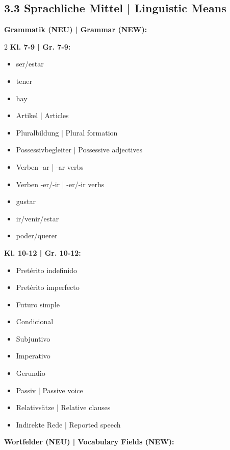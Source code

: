 \documentclass[11pt,a4paper]{article}
\begin{document}
\subsection*{3.3 Sprachliche Mittel | Linguistic Means}

\textbf{Grammatik (NEU) | Grammar (NEW):}

\begin{multicols}{2}
\textbf{Kl. 7-9 | Gr. 7-9:}
\begin{itemize}[leftmargin=*, nosep]
    \item[$\square$] ser/estar
    \item[$\square$] tener
    \item[$\square$] hay
    \item[$\square$] Artikel | Articles
    \item[$\square$] Pluralbildung | Plural formation
    \item[$\square$] Possessivbegleiter | Possessive adjectives
    \item[$\square$] Verben -ar | -ar verbs
    \item[$\square$] Verben -er/-ir | -er/-ir verbs
    \item[$\square$] gustar
    \item[$\square$] ir/venir/estar
    \item[$\square$] poder/querer
\end{itemize}

\columnbreak

\textbf{Kl. 10-12 | Gr. 10-12:}
\begin{itemize}[leftmargin=*, nosep]
    \item[$\square$] Pretérito indefinido
    \item[$\square$] Pretérito imperfecto
    \item[$\square$] Futuro simple
    \item[$\square$] Condicional
    \item[$\square$] Subjuntivo
    \item[$\square$] Imperativo
    \item[$\square$] Gerundio
    \item[$\square$] Passiv | Passive voice
    \item[$\square$] Relativsätze | Relative clauses
    \item[$\square$] Indirekte Rede | Reported speech
\end{itemize}
\end{multicols}

\textbf{Wortfelder (NEU) | Vocabulary Fields (NEW):}
\end{document}
